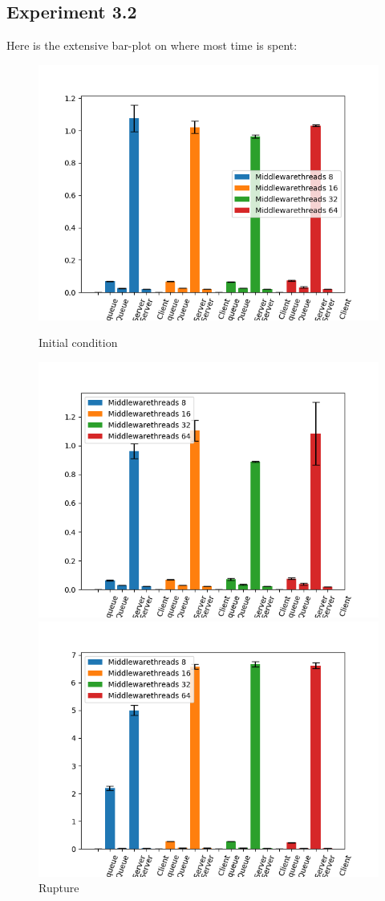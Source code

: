 \documentclass[11pt,a4paper]{article}
\begin{document}
\subsection{Experiment 3.2}
Here is the extensive bar-plot on where most time is spent:


\begin{figure}[H] 
  \label{ fig7} 
  \begin{minipage}[b]{0.5\linewidth}
    \centering
    \includegraphics[width=0.7\linewidth]{img/exp3_2/exp3_2_mw_percentile_plots_writes_0__vc_1.png} 
    \caption{Initial condition} 
    \vspace{4ex}
  \end{minipage}%
  \begin{minipage}[b]{0.5\linewidth}
    \centering
    \includegraphics[width=0.7\linewidth]{img/exp3_2/exp3_2_mw_percentile_plots_writes_1__vc_1.png} 
    \caption{Rupture} 
    \vspace{4ex}
  \end{minipage} 
  \begin{minipage}[b]{0.5\linewidth}
    \centering
    \includegraphics[width=0.7\linewidth]{img/exp3_2/exp3_2_mw_percentile_plots_writes_0__vc_4.png} 

\end{minipage}
\end{figure}
\end{document}
